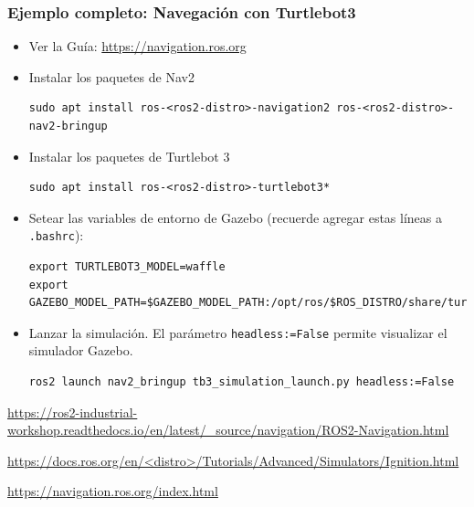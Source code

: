 \begin{frame}[fragile]
	\frametitle{Ejemplo completo: Navegación con Turtlebot3}

    \footnotesize
    \begin{itemize}


        \item Ver la Guía: \url{https://navigation.ros.org}
    
        \item Instalar los paquetes de Nav2 
        
        \begin{lstlisting}[style=bash] 
sudo apt install ros-<ros2-distro>-navigation2 ros-<ros2-distro>-nav2-bringup
        \end{lstlisting}
    
        \item Instalar los paquetes de Turtlebot 3
        
        \begin{lstlisting}[style=bash] 
sudo apt install ros-<ros2-distro>-turtlebot3*
        \end{lstlisting}
    
        \item Setear las variables de entorno de Gazebo (recuerde agregar estas líneas a \lstinline[style=bash]{.bashrc}):
        
        \begin{lstlisting}[style=bash,basicstyle=\tiny] 
export TURTLEBOT3_MODEL=waffle
export GAZEBO_MODEL_PATH=$GAZEBO_MODEL_PATH:/opt/ros/$ROS_DISTRO/share/turtlebot3_gazebo/models
        \end{lstlisting}
    
        \item Lanzar la simulación. El parámetro \lstinline[style=bash]{headless:=False} permite visualizar el simulador Gazebo.
        
        \begin{lstlisting}[style=bash] 
ros2 launch nav2_bringup tb3_simulation_launch.py headless:=False
        \end{lstlisting}
     
    \end{itemize}
    \tiny
    \url{https://ros2-industrial-workshop.readthedocs.io/en/latest/\_source/navigation/ROS2-Navigation.html}
        
    \url{https://docs.ros.org/en/<distro>/Tutorials/Advanced/Simulators/Ignition.html}
        
    \url{https://navigation.ros.org/index.html}

\end{frame}


